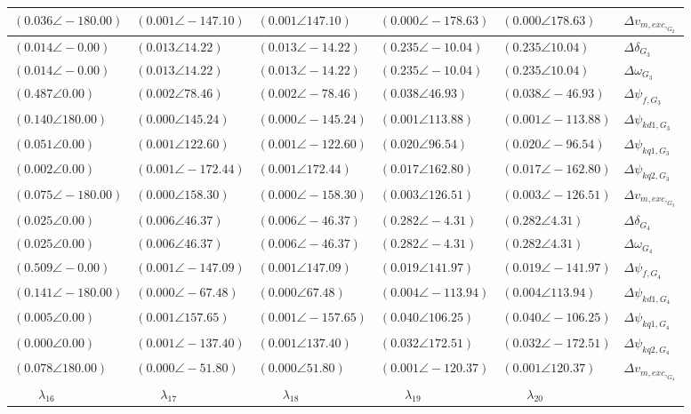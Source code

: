 \begin{tabular}{lllll|l}
$(0.036 \angle -180.00)$	& $(0.001 \angle -147.10)$	& $(0.001 \angle 147.10)$	& $(0.000 \angle -178.63)$	& $(0.000 \angle 178.63)$	& $\Delta v_{m,exc,_{G_2}}$ \\ 
 \hline 
$(0.014 \angle -0.00)$	& $(0.013 \angle 14.22)$	& $(0.013 \angle -14.22)$	& $\mathbf{(0.235 \angle -10.04)}$	& $\mathbf{(0.235 \angle 10.04)}$	& $\Delta\delta_{G_3}$ \\ 
$(0.014 \angle -0.00)$	& $(0.013 \angle 14.22)$	& $(0.013 \angle -14.22)$	& $\mathbf{(0.235 \angle -10.04)}$	& $\mathbf{(0.235 \angle 10.04)}$	& $\Delta\omega_{G_3}$ \\ 
$\mathbf{(0.487 \angle 0.00)}$	& $(0.002 \angle 78.46)$	& $(0.002 \angle -78.46)$	& $(0.038 \angle 46.93)$	& $(0.038 \angle -46.93)$	& $\Delta \psi_{f,G_3}$ \\ 
$\mathbf{(0.140 \angle 180.00)}$	& $(0.000 \angle 145.24)$	& $(0.000 \angle -145.24)$	& $(0.001 \angle 113.88)$	& $(0.001 \angle -113.88)$	& $\Delta \psi_{kd1,G_3}$ \\ 
$\mathbf{(0.051 \angle 0.00)}$	& $(0.001 \angle 122.60)$	& $(0.001 \angle -122.60)$	& $(0.020 \angle 96.54)$	& $(0.020 \angle -96.54)$	& $\Delta \psi_{kq1,G_3}$ \\ 
$(0.002 \angle 0.00)$	& $(0.001 \angle -172.44)$	& $(0.001 \angle 172.44)$	& $(0.017 \angle 162.80)$	& $(0.017 \angle -162.80)$	& $\Delta \psi_{kq2,G_3}$ \\ 
$\mathbf{(0.075 \angle -180.00)}$	& $(0.000 \angle 158.30)$	& $(0.000 \angle -158.30)$	& $(0.003 \angle 126.51)$	& $(0.003 \angle -126.51)$	& $\Delta v_{m,exc,_{G_3}}$ \\ 
 \hline 
$(0.025 \angle 0.00)$	& $(0.006 \angle 46.37)$	& $(0.006 \angle -46.37)$	& $\mathbf{(0.282 \angle -4.31)}$	& $\mathbf{(0.282 \angle 4.31)}$	& $\Delta\delta_{G_4}$ \\ 
$(0.025 \angle 0.00)$	& $(0.006 \angle 46.37)$	& $(0.006 \angle -46.37)$	& $\mathbf{(0.282 \angle -4.31)}$	& $\mathbf{(0.282 \angle 4.31)}$	& $\Delta\omega_{G_4}$ \\ 
$\mathbf{(0.509 \angle -0.00)}$	& $(0.001 \angle -147.09)$	& $(0.001 \angle 147.09)$	& $(0.019 \angle 141.97)$	& $(0.019 \angle -141.97)$	& $\Delta \psi_{f,G_4}$ \\ 
$\mathbf{(0.141 \angle -180.00)}$	& $(0.000 \angle -67.48)$	& $(0.000 \angle 67.48)$	& $(0.004 \angle -113.94)$	& $(0.004 \angle 113.94)$	& $\Delta \psi_{kd1,G_4}$ \\ 
$(0.005 \angle 0.00)$	& $(0.001 \angle 157.65)$	& $(0.001 \angle -157.65)$	& $(0.040 \angle 106.25)$	& $(0.040 \angle -106.25)$	& $\Delta \psi_{kq1,G_4}$ \\ 
$(0.000 \angle 0.00)$	& $(0.001 \angle -137.40)$	& $(0.001 \angle 137.40)$	& $(0.032 \angle 172.51)$	& $(0.032 \angle -172.51)$	& $\Delta \psi_{kq2,G_4}$ \\ 
$\mathbf{(0.078 \angle 180.00)}$	& $(0.000 \angle -51.80)$	& $(0.000 \angle 51.80)$	& $(0.001 \angle -120.37)$	& $(0.001 \angle 120.37)$	& $\Delta v_{m,exc,_{G_4}}$ \\ 
 \hline 
\hline 
$\qquad\lambda_{16}$	&$\qquad\lambda_{17}$	&$\qquad\lambda_{18}$	&$\qquad\lambda_{19}$	&$\qquad\lambda_{20}$	&
\end{tabular}

